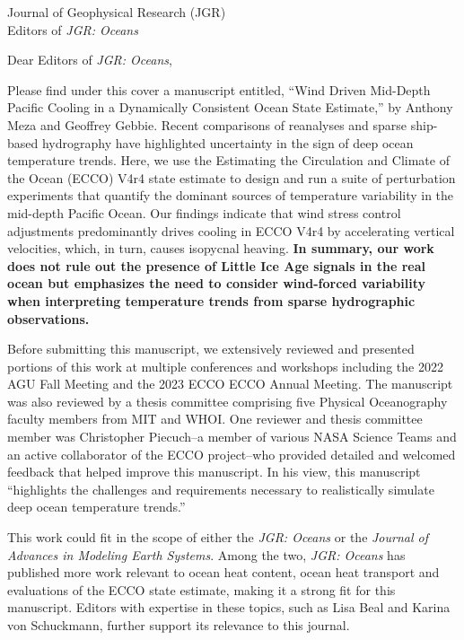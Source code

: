 \documentclass[12pt]{WHOIletter}
\begin{document}
\begin{letter}{
Journal of Geophysical Research (JGR) \\
Editors of {\it JGR: Oceans} \\
}
\opening{Dear Editors of {\it JGR: Oceans},} 

Please find under this cover a manuscript entitled, ``Wind Driven
Mid-Depth Pacific Cooling in a Dynamically Consistent Ocean State
Estimate,'' by Anthony Meza and Geoffrey Gebbie.  Recent comparisons
of reanalyses and sparse ship-based hydrography have highlighted
uncertainty in the sign of deep ocean temperature trends. Here, we use
the Estimating the Circulation and Climate of the Ocean (ECCO) V4r4
state estimate to design and run a suite of perturbation experiments
that quantify the dominant sources of temperature variability in the
mid-depth Pacific Ocean. Our findings indicate that wind stress
control adjustments predominantly drives cooling in ECCO V4r4 by
accelerating vertical velocities, which, in turn, causes isopycnal
heaving. \textbf{In summary, our work does not rule out the presence
  of Little Ice Age signals in the real ocean but emphasizes the need
  to consider wind-forced variability when interpreting temperature
  trends from sparse hydrographic observations.}

Before submitting this manuscript, we extensively reviewed and
presented portions of this work at multiple conferences and workshops
including the 2022 AGU Fall Meeting and the 2023 ECCO ECCO Annual
Meeting. The manuscript was also reviewed by a thesis committee
comprising five Physical Oceanography faculty members from MIT and
WHOI.  One reviewer and thesis committee member was Christopher
Piecuch--a member of various NASA Science Teams and an active
collaborator of the ECCO project--who provided detailed and welcomed
feedback that helped improve this manuscript.  In his view, this
manuscript ``highlights the challenges and requirements necessary to
realistically simulate deep ocean temperature trends.''

This work could fit in the scope of either the {\it JGR: Oceans} or
the {\it Journal of Advances in Modeling Earth Systems}.  Among the
two, {\it JGR: Oceans} has published more work relevant to ocean heat
content, ocean heat transport and evaluations of the ECCO state
estimate, making it a strong fit for this manuscript.  Editors with
expertise in these topics, such as Lisa Beal and Karina von
Schuckmann, further support its relevance to this journal.


\end{letter}
\end{document}

